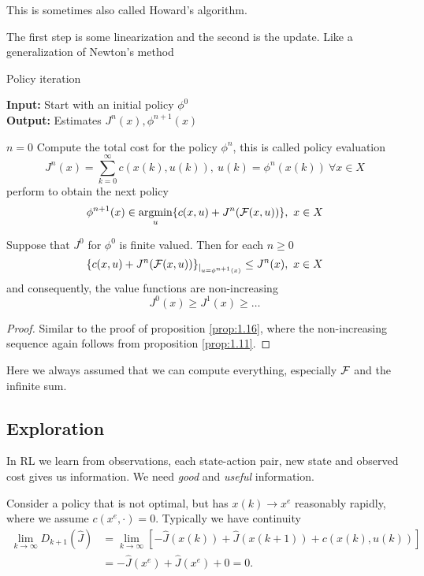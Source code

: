 This is sometimes also called Howard's algorithm.

\begin{remark}
    The first step is some linearization and the second is the update. Like a generalization of Newton's method    
\end{remark}

\begin{algorithm}[H]
    \caption{Policy iteration}
    \textbf{Input:} Start with an initial policy \(\phi^0\)\\
    \textbf{Output:} Estimates \(J^n(x), \phi^{n+1}(x)\)
    \begin{algorithmic}
    \State \(n=0\)
        \State Compute the total cost for the policy \(\phi^n\), this is called policy evaluation
            \[J^n(x)=\sum_{k=0}^\infty c(x(k),u(k)),\ u(k)=\phi^n(x(k))\ \forall x\in X\]
        \State perform  to obtain the next policy 
            \[\phi^{n+1}(x)\in \operatorname*{\text{argmin}}_{u}\{c(x,u)+J^n(\mathcal{F}(x,u))\},\ x\in X\]
    \EndWhile
    \end{algorithmic}
\end{algorithm}

\begin{proposition}\label{prop:1.17}
    Suppose that \(J^0\) for \(\phi^0\) is finite valued. Then 
    for each \(n\geq 0\)
    \[\{c(x,u)+J^n(\mathcal{F}(x,u))\}_{|_{u=\phi^{n+1}(x)}}\leq J^n(x),\ x\in X\]
    and consequently, the value functions are non-increasing
    \[J^0(x)\geq J^1(x)\geq \dots\]
\end{proposition}

\begin{proof}
    Similar to the proof of proposition \ref{prop:1.16}, where the non-increasing sequence again follows  
    from proposition \ref{prop:1.11}. 
\end{proof}

Here we always assumed that we can compute everything, especially \(\mathcal{F}\) and the infinite sum.

\subsection{Exploration}
In RL we learn from observations, each state-action pair,
new state and observed cost gives us information. We need 
\textit{good} and \textit{useful} information. 

Consider a policy that is not optimal, but has 
\(x(k)\to x^e\) reasonably rapidly, where we assume \(c(x^e,\cdot)=0\).
Typically we have continuity 
\begin{align*}
    \lim_{k\to \infty} D_{k+1}(\hat{J}) & = \lim_{k\to\infty} \left[
        -\hat{J}(x(k))+\hat{J}(x(k+1))+c(x(k),u(k))
    \right] \\
    &=-\hat{J}(x^e)+\hat{J}(x^e)+0=0. 
\end{align*}

